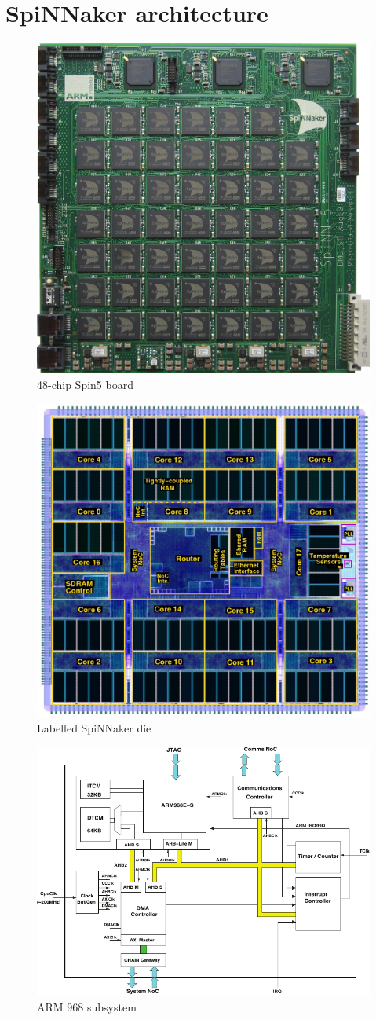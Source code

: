 \documentclass[oneside, a4paper, 11pt]{memoir}
\begin{document}
\section{SpiNNaker architecture}
\begin{figure}[htbp]
	\centering
	\includegraphics[width=0.6\linewidth]{images/spin5.jpg}
	\caption{48-chip Spin5 board}
\end{figure}

\begin{figure}[htbp]
	\centering
	\includegraphics[width=0.5\linewidth]{images/spin2_labelled.jpg}
	\caption{Labelled SpiNNaker die}
\end{figure}

\begin{figure}[htbp]
	\centering
	\includegraphics[width=0.8\linewidth]{images/arm968_subsystem.pdf}
	\caption{ARM 968 subsystem}
\end{figure}
\end{document}
